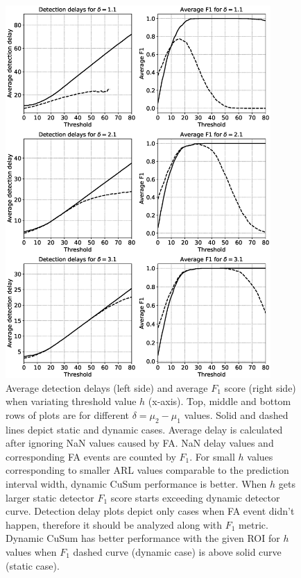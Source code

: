 \begin{figure}[!htb]
	\centering
	\includegraphics[width=0.90\textwidth]{articles/pics/journal_paper/performance_detection_sim}
	\caption{Average detection delays (left side) and average $F_1$ score (right side) when variating threshold value $h$ (x-axis).
	Top, middle and bottom rows of plots are for different $\delta = \mu_2 - \mu_1$ values.
	Solid and dashed lines depict static and dynamic cases.
    Average delay is calculated after ignoring NaN values caused by FA.
    NaN delay values and corresponding FA events are counted by $F_1$.
    For small $h$ values corresponding to smaller ARL values comparable to the prediction interval width, dynamic CuSum performance is better.
    When $h$ gets larger static detector $F_1$ score starts exceeding dynamic detector curve.
    Detection delay plots depict only cases when FA event didn't happen, therefore it should be analyzed along with $F_1$ metric.
    Dynamic CuSum has better performance with the given ROI for $h$ values when $F_1$ dashed curve (dynamic case) is above solid curve (static case).
	}
	\label{fig:artificial_signal_perf_results}
\end{figure}


